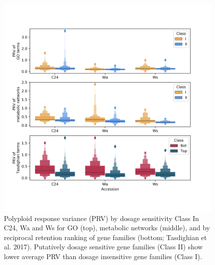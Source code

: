\documentclass[11pt]{article}
\begin{document}
\begin{figure}[h!]
    \includegraphics[width=\linewidth]{../figures/all_prv_boxen.png}
 \caption{Polyploid response variance (PRV) by dosage sensitivity Class In C24, Wa and Ws for GO (top), metabolic networks (middle), and by reciprocal retention ranking of gene families (bottom; Tasdighian et al. 2017). Putatively dosage sensitive gene families (Class II) show lower average PRV than dosage insensitive gene families (Class I).}
  \label{fig3}
\end{figure}
\end{document}
